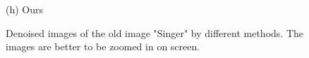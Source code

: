 \documentclass[10pt,twocolumn,letterpaper]{article}
\begin{document}
\begin{figure}
{\begin{minipage}[t]{0.244\textwidth}
{\footnotesize (h) Ours }
\end{minipage}
}
\caption{Denoised images of the old image "Singer" by different methods. The images are better to be zoomed in on screen.}
\label{fig1}
\end{figure}
\end{document}
